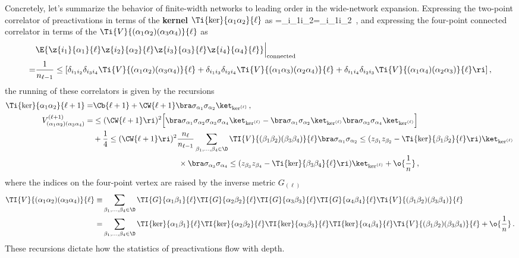 Concretely, let's summarize the behavior of finite-width networks to leading order in the wide-network expansion. Expressing the two-point correlator of preactivations in terms of the \textbf{kernel} $\Ti{\ker}{\alpha_1\alpha_2}{\ell}$ as
\be\label{eq:leading-kernel-reminder}
=\delta_{i_1i_2}=\delta_{i_1i_2} \, ,
\ee
and expressing the four-point connected correlator in terms of the  $\Ti{V}{(\alpha_1\alpha_2)(\alpha_3\alpha_4)}{\ell}$  as
\begin{align}\label{eq:C4_MLPH_reprint}
&\E{\z{i_1}{\alpha_1}{\ell}\z{i_2}{\alpha_2}{\ell}\z{i_3}{\alpha_3}{\ell}\z{i_4}{\alpha_4}{\ell}}\Big\vert_{\text{connected}}\, \\
=&\frac{1}{n_{\ell-1}}\le[\delta_{i_1i_2}\delta_{i_3 i_4}\Ti{V}{(\alpha_1\alpha_2)(\alpha_3\alpha_4)}{\ell}+\delta_{i_1i_3}\delta_{i_2 i_4}\Ti{V}{(\alpha_1\alpha_3)(\alpha_2\alpha_4)}{\ell}+\delta_{i_1i_4}\delta_{i_2 i_3}\Ti{V}{(\alpha_1\alpha_4)(\alpha_2\alpha_3)}{\ell} \ri]\, , \nonumber
\end{align}
the running of these correlators is given by the recursions
\begin{align}
\label{eq:K-recursion-reprint}
\Ti{\ker}{\alpha_1\alpha_2}{\ell+1}=&\Cb{\ell+1}+\CW{\ell+1}\bra \sigma_{\alpha_1}\sigma_{\alpha_2}\ket_{\ker^{(\ell)}}\, ,\\
\label{eq:V-recursion-reprint}
V^{(\ell+1)}_{(\alpha_1\alpha_2)(\alpha_3\alpha_4)}=&\le(\CW{\ell+1}\ri)^2\Big[\bra\sigma_{\alpha_1} \sigma_{\alpha_2} \sigma_{\alpha_3} \sigma_{\alpha_4}\ket_{\ker^{(\ell)}}  - \bra \sigma_{\alpha_1} \sigma_{\alpha_2}\ket_{\ker^{(\ell)}} \bra \sigma_{\alpha_3} \sigma_{\alpha_4}\ket_{\ker^{(\ell)}} \Big]\, \\
&+\frac{1}{4}\le(\CW{\ell+1}\ri)^2\frac{n_{\ell}}{n_{\ell-1}}\sum_{\beta_1,\ldots,\beta_4\in\D}\TI{V}{(\beta_1\beta_2)(\beta_3\beta_4)}{\ell}\bra\sigma_{\alpha_1}\sigma_{\alpha_2} \le(z_{\beta_1} z_{\beta_2}-\Ti{\ker}{\beta_1\beta_2}{\ell}\ri)\ket_{\ker^{(\ell)}}\, \nonumber\\
&\quad \quad \quad \quad \quad \quad \quad \quad \quad \quad \quad \times\bra \sigma_{\alpha_3}\sigma_{\alpha_4} \le(z_{\beta_3} z_{\beta_4}-\Ti{\ker}{\beta_3\beta_4}{\ell}\ri)\ket_{\ker^{(\ell)}}+\o{\frac{1}{n}} \, ,\nonumber
\end{align}
where the indices on the four-point vertex are raised by the inverse metric $G_{(\ell)}$
\begin{align}
\TI{V}{(\alpha_1\alpha_2)(\alpha_3\alpha_4)}{\ell}\equiv& \sum_{\beta_1,\ldots,\beta_4\in\D}\TI{G}{\alpha_1\beta_1}{\ell}\TI{G}{\alpha_2\beta_2}{\ell}\TI{G}{\alpha_3\beta_3}{\ell}\TI{G}{\alpha_4\beta_4}{\ell}\Ti{V}{(\beta_1\beta_2)(\beta_3\beta_4)}{\ell}\, \\
=&\sum_{\beta_1,\ldots,\beta_4\in\D}\TI{\ker}{\alpha_1\beta_1}{\ell}\TI{\ker}{\alpha_2\beta_2}{\ell}\TI{\ker}{\alpha_3\beta_3}{\ell}\TI{\ker}{\alpha_4\beta_4}{\ell}\Ti{V}{(\beta_1\beta_2)(\beta_3\beta_4)}{\ell}+\o{\frac{1}{n}}\, .\nonumber
\end{align}
These recursions dictate how the statistics of preactivations  flow with depth.

